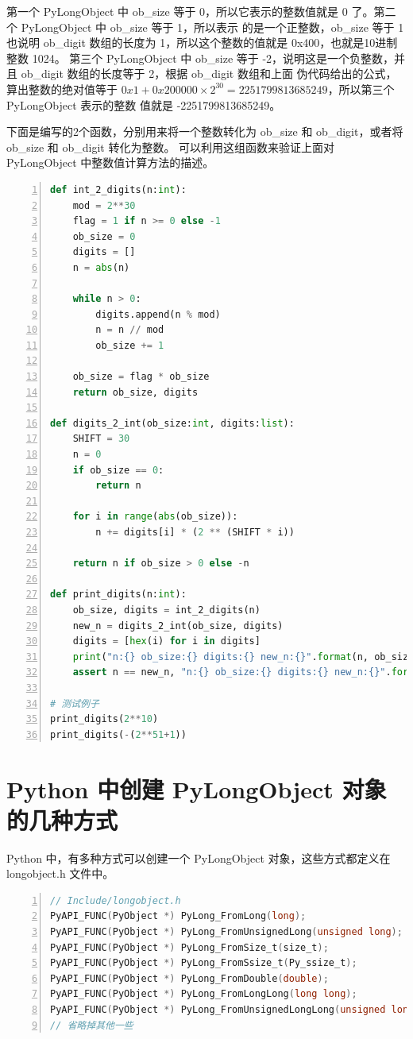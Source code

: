 第一个 PyLongObject 中 ob\_size 等于 0，所以它表示的整数值就是 0 了。第二个 PyLongObject 中 ob\_size 等于 1，所以表示
的是一个正整数，ob\_size 等于 1 也说明 ob\_digit 数组的长度为 1，所以这个整数的值就是 0x400，也就是10进制整数 1024。
第三个 PyLongObject 中 ob\_size 等于 -2，说明这是一个负整数，并且 ob\_digit 数组的长度等于 2，根据 ob\_digit 数组和上面
伪代码给出的公式，算出整数的绝对值等于 $0x1 + 0x200000 \times 2^{30} = 2251799813685249$，所以第三个 PyLongObject 表示的整数
值就是 -2251799813685249。

下面是编写的2个函数，分别用来将一个整数转化为 ob\_size 和 ob\_digit，或者将 ob\_size 和 ob\_digit 转化为整数。
可以利用这组函数来验证上面对 PyLongObject 中整数值计算方法的描述。

\begin{lstlisting}[language=Python, numbers=left, numbersep=1em, numberstyle=\footnotesize , breaklines=true]
def int_2_digits(n:int):
    mod = 2**30
    flag = 1 if n >= 0 else -1
    ob_size = 0
    digits = []
    n = abs(n)
    
    while n > 0:
        digits.append(n % mod)
        n = n // mod
        ob_size += 1

    ob_size = flag * ob_size
    return ob_size, digits

def digits_2_int(ob_size:int, digits:list):
    SHIFT = 30
    n = 0
    if ob_size == 0:
        return n

    for i in range(abs(ob_size)):
        n += digits[i] * (2 ** (SHIFT * i))

    return n if ob_size > 0 else -n

def print_digits(n:int):
    ob_size, digits = int_2_digits(n)
    new_n = digits_2_int(ob_size, digits)
    digits = [hex(i) for i in digits]
    print("n:{} ob_size:{} digits:{} new_n:{}".format(n, ob_size, digits, new_n))
    assert n == new_n, "n:{} ob_size:{} digits:{} new_n:{}".format(n, ob_size, digits, new_n)

# 测试例子
print_digits(2**10)
print_digits(-(2**51+1))
\end{lstlisting}


\section{Python 中创建 PyLongObject 对象的几种方式}

Python 中，有多种方式可以创建一个 PyLongObject 对象，这些方式都定义在 longobject.h 文件中。

\begin{lstlisting}[language=C, numbers=left, numbersep=1em, numberstyle=\footnotesize , breaklines=true]
// Include/longobject.h
PyAPI_FUNC(PyObject *) PyLong_FromLong(long);
PyAPI_FUNC(PyObject *) PyLong_FromUnsignedLong(unsigned long);
PyAPI_FUNC(PyObject *) PyLong_FromSize_t(size_t);
PyAPI_FUNC(PyObject *) PyLong_FromSsize_t(Py_ssize_t);
PyAPI_FUNC(PyObject *) PyLong_FromDouble(double);
PyAPI_FUNC(PyObject *) PyLong_FromLongLong(long long);
PyAPI_FUNC(PyObject *) PyLong_FromUnsignedLongLong(unsigned long long);
// 省略掉其他一些
\end{lstlisting}

